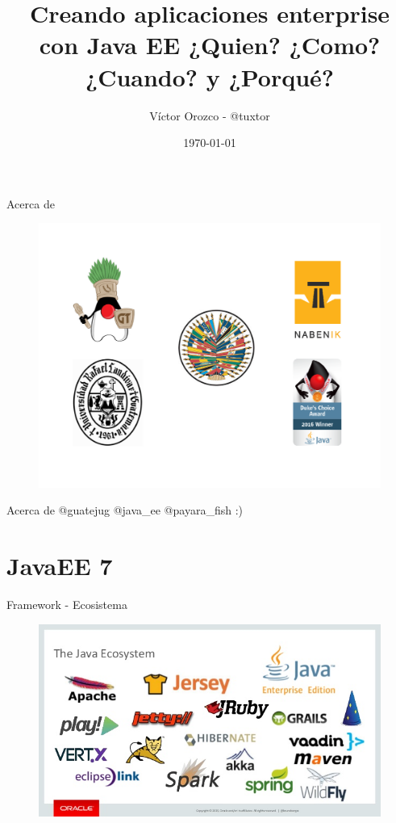\documentclass{beamer}
\title{Creando aplicaciones enterprise con Java EE ¿Quien? ¿Como? ¿Cuando? y ¿Porqué?}
\author{Víctor Orozco - @tuxtor}
\institute{III CONING 2017 - UPAO Perú}
\date{\today}
\begin{document}
\frame{\titlepage}

\begin{frame}{Acerca de}
\begin{figure}
	\centering
	\includegraphics[width=\linewidth]{Images/fescudos}
\end{figure}
\end{frame}

\begin{frame}{Acerca de}
\huge @guatejug @java\_ee @payara\_fish :)
\end{frame}



\section{JavaEE 7}
\begin{frame}{Framework - Ecosistema}
	\begin{figure}
		\centering
		\includegraphics[width=0.9\linewidth]{Images/ecosystem}
	\end{figure}
\end{frame}
\end{document}
